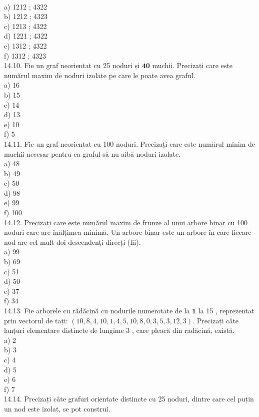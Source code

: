 {{\\
a) 1212 ; 4322
\\
b) 1212 ; 4323
\\
c) 1213 ; 4322
\\
d) 1221 ; 4322
\\
e) 1312 ; 4322
\\
f) 1312 ; 4323
\\
14.10. Fie un graf neorientat cu 25 noduri și $\mathbf{4 0}$ muchii. Precizați care este numărul maxim de noduri izolate pe care le poate avea graful.
\\
a) 16
\\
b) 15
\\
c) 14
\\
d) 13
\\
e) 10
\\
f) 5
\\
14.11. Fie un graf neorientat cu 100 noduri. Precizați care este numărul minim de muchii necesar pentru ca graful să nu aibă noduri izolate.
\\
a) 48
\\
b) 49
\\
c) 50
\\
d) 98
\\
e) 99
\\
f) 100
\\
14.12. Precizați care este numărul maxim de frunze al unui arbore binar cu 100 noduri care are înălțimea minimă. Un arbore binar este un arbore în care fiecare nod are cel mult doi descendenți direcți (fii).
\\
a) 99
\\
b) 69
\\
c) 51
\\
d) 50
\\
e) 37
\\
f) 34
\\
14.13. Fie arborele cu rădăcină cu nodurile numerotate de la $\mathbf{1}$ la 15 , reprezentat prin vectorul de tați: $(10,8,4,10,1,4,5,10,8,0,3,5,3,12,3)$. Precizați câte lanțuri elementare distincte de lungime 3 , care pleacă din radăcină, există.
\\
a) 2
\\
b) 3
\\
c) 4
\\
d) 5
\\
e) 6
\\
f) 7
\\
14.14. Precizați câte grafuri orientate distincte cu 25 noduri, dintre care cel puțin un nod este izolat, se pot construi.
}}
